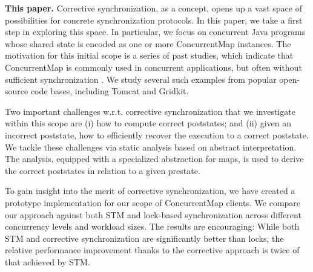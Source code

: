 \noindent \textbf{This paper.} Corrective synchronization, as a concept, opens up a vast space of possibilities for concrete synchronization protocols. In this paper, we take a first step in exploring this space. In particular, we focus on concurrent Java programs whose shared state is encoded as one or more {\sf ConcurrentMap} instances. The motivation for this initial scope is a series of past studies, which indicate that {\sf ConcurrentMap} is commonly used in concurrent applications, but often without sufficient synchronization \cite{oopsla/ShachamBASVY11,issta/ShachamYGABSV14}. We study several such examples from popular open-source code bases, including Tomcat and Gridkit.

Two important challenges w.r.t. corrective synchronization that we investigate within this scope are (i) how to compute correct poststates; and (ii) given an incorrect poststate, how to efficiently recover the execution to a correct poststate. 
We tackle these challenges via static analysis based on abstract interpretation. The analysis, equipped with a specialized abstraction for maps, is used to derive the correct poststates in relation to a given prestate. 


To gain insight into the merit of corrective synchronization, we have created a prototype implementation for our scope of {\sf ConcurrentMap} clients. We compare our approach against both STM and lock-based synchronization across different concurrency levels and workload sizes. The results are encouraging: While both STM and corrective synchronization are significantly better than locks, the relative performance improvement thanks to the corrective approach is twice of that achieved by STM.
%
%
%
%

